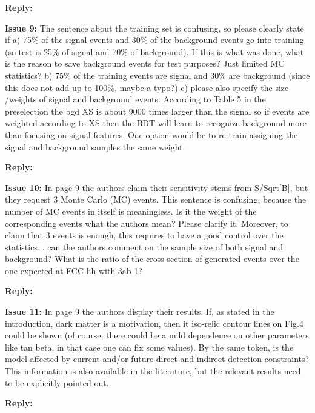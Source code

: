 \documentclass[12pt]{article}
\newcommand{\issue}[1]{\bigskip\noindent\textbf{\color{Maroon}Issue #1: }}
\newcommand{\reply}{\medskip\noindent\textbf{\color{RoyalBlue}Reply:}}
\begin{document}
\reply{} 

\issue{9} The sentence about the training set is confusing, so
please clearly state if a) 75\% of the signal events and 30\% of the background
events go into training (so test is 25\% of signal and 70\% of background). If
this is what was done, what is the reason to save background events for test
purposes? Just limited MC statistics?  b) 75\% of the training events are signal
and 30\% are background (since this does not add up to 100\%, maybe a typo?) c)
please also specify the size /weights of signal and background events.
According to Table 5 in the preselection the bgd XS is about 9000 times larger
than the signal so if events are weighted according to XS then the BDT will
learn to recognize background more than focusing on signal features. One option
would be to re-train assigning the signal and background samples the same
weight.

\reply{} 

\issue{10} In page 9 the authors claim their sensitivity stems
from S/Sqrt[B], but they request 3 Monte Carlo (MC) events. This sentence is
confusing, because the number of MC events in itself is meaningless. Is it the
weight of the corresponding events what the authors mean? Please clarify it.
Moreover, to claim that 3 events is enough, this requires to have a good
control over the statistics... can the authors comment on the sample size of
both signal and background? What is the ratio of the cross section of generated
events over the one expected at FCC-hh with 3ab-1?

\reply{} 

\issue{11} In page 9 the authors display their results. If, as
stated in the introduction, dark matter is a motivation, then it iso-relic
contour lines on Fig.4 could be shown (of course, there could be a mild
dependence on other parameters like tan beta, in that case one can fix some
values). By the same token, is the model affected by current and/or future
direct and indirect detection constraints? This information is also available
in the literature, but the relevant results need to be explicitly pointed out.

\reply{} 
\end{document}
